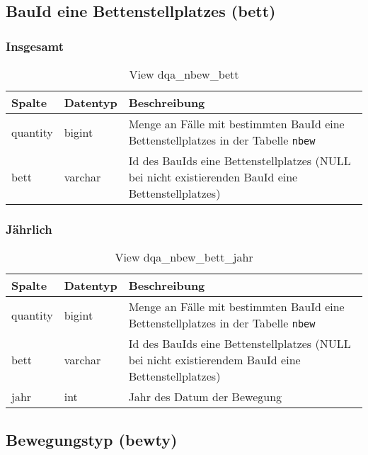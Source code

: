 \newpage

\subsection{BauId eine Bettenstellplatzes (bett)} \label{subsec:bett}

\subsubsection{Insgesamt} \label{subsubsec:bettI}

\begin{table}[ht]
	\centering   
	\caption{View dqa\_nbew\_bett}
	\label{tab:beweBettAll}
	\begin{tabular}{||l|l|p{10cm}||}   		
		\hline
		Spalte & Datentyp & Beschreibung \\ [0.5ex]
		\hline\hline
		quantity & bigint & Menge an Fälle mit bestimmten BauId eine Bettenstellplatzes in der Tabelle \texttt{nbew} \\
		\hline
		bett & varchar & Id des BauIds eine Bettenstellplatzes (NULL bei nicht existierenden BauId eine Bettenstellplatzes)\\
		\hline
		
	\end{tabular}
\end{table}

\subsubsection{Jährlich} \label{subsubsec:bettJ}

\begin{table}[ht]
	\centering   
	\caption{View dqa\_nbew\_bett\_jahr}
	\label{tab:beweBettJahr}
	\begin{tabular}{||l|l|p{10cm}||}   		
		\hline
		Spalte & Datentyp & Beschreibung \\ [0.5ex]
		\hline\hline
		quantity & bigint & Menge an Fälle mit bestimmten BauId eine Bettenstellplatzes in der Tabelle \texttt{nbew} \\
		\hline
		bett & varchar &  Id des BauIds eine Bettenstellplatzes (NULL bei nicht existierendem BauId eine Bettenstellplatzes) \\
		\hline
		jahr & int &  Jahr des Datum der Bewegung \\
		\hline		
	\end{tabular}
\end{table}

\subsection{Bewegungstyp (bewty)} \label{subsec:bewtyp}


